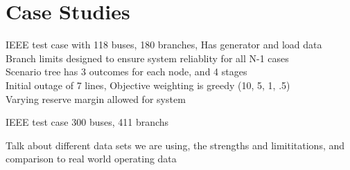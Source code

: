 
\section{Case Studies} 
   IEEE test case with 118 buses, 180 branches,   Has generator and load data \newline \\
   Branch limits designed to ensure system reliablity for all N-1 cases \\
   Scenario tree has 3 outcomes for each node, and 4 stages \\
   Initial outage of 7 lines,   Objective weighting is greedy (10, 5, 1, .5) \\
   Varying reserve margin allowed for system

  IEEE test case 300 buses, 411 branchs

Talk about different data sets we are using, the strengths and limititations, and comparison to real world operating data






